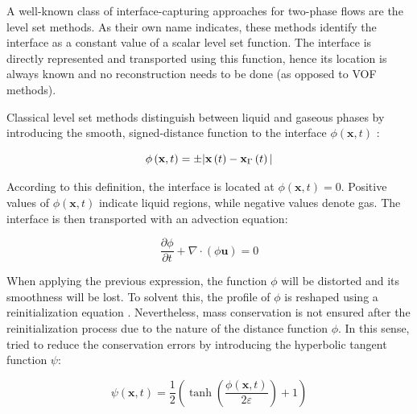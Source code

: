 

A well-known class of interface-capturing approaches for two-phase flows are the level set methods. As their own name indicates, these methods identify the interface as a constant value of a scalar level set function. The interface is directly represented and transported using this function, hence its location is always known and no reconstruction needs to be done (as opposed to VOF methods).

Classical level set methods  distinguish between liquid and gaseous phases by introducing the smooth, signed-distance function to the interface $\phi(\textbf{x},t)$ :

\begin{equation}
\label{eq:LS_phi_definition}
\phi \left( \textbf{x},t \right)=\pm |\textbf{x}\left( t \right)-\textbf{x}_{\scriptsize{\Gamma}} \left( t \right)|
\end{equation}

According to this definition, the interface is located at $\phi(\textbf{x},t) = 0$. Positive values of $\phi(\textbf{x},t)$ indicate liquid regions, while negative values denote gas. The interface is then transported with an advection equation:

\begin{equation}
	\label{eq:LS_classical_advection}
	\frac{\partial \phi}{\partial t} + \nabla \cdot \left( \phi \boldsymbol{u} \right) = 0
\end{equation}

When applying the previous expression, the function $\phi$ will be distorted and its smoothness will be lost. To solvent this, the profile of $\phi$ is reshaped using a reinitialization equation . Nevertheless, mass conservation is not ensured after the reinitialization process due to the nature of the distance function $\phi$. In this sense,  tried to reduce the conservation errors by introducing the hyperbolic tangent function $\psi$:

\begin{equation}
\label{eq:ACLS_psi_definition}
\psi \left( \textbf{x},t \right)=\frac{1}{2} \left(\tanh\left(\frac{\phi(\textbf{x},t)}{2\varepsilon}\right)+1\right)
\end{equation}

